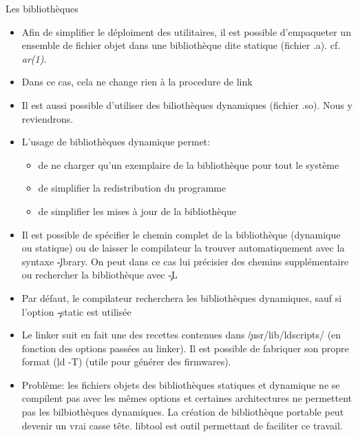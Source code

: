 \begin{frame}[fragile=singleslide]{Les bibliothèques}
  \begin{itemize} 
  \item  Afin de  simplifier  le déploiment  des  utilitaires, il  est
    possible  d'empaqueter  un  ensemble  de fichier  objet  dans  une
    bibliothèque dite statique (fichier .a). cf. \emph{ar(1)}.
  \item Dans ce cas, cela ne change rien à la procedure de link
  \item Il  est aussi possible d'utiliser  des biliothèques dynamiques
    (fichier .so). Nous y reviendrons.
  \item L'usage de bibliothèques dynamique permet:
    \begin{itemize} 
    \item de ne charger qu'un  exemplaire de la bibliothèque pour tout
      le système
    \item de simplifier la redistribution du programme
    \item de simplifier les mises à jour de la bibliothèque
    \end{itemize} 
  \item  Il  est  possible  de  spécifier  le  chemin  complet  de  la
    bibliothèque (dynamique ou statique)  ou de laisser le compilateur
    la trouver  automatiquement avec  la syntaxe \c{-lbrary}.  On peut
    dans ce cas lui précisier des chemins supplémentaire ou rechercher
    la bibliothèque avec \c{-L}
  \item  Par  défaut,  le  compilateur  recherchera  les  bibliothèques
    dynamiques, sauf si l'option \c{-static} est utilisée
  \item  Le  linker suit  en  fait  une  des recettes  contenues  dans
    \c{/usr/lib/ldscripts/}  (en  fonction   des  options  passées  au
    linker).   Il   est  possible  de  fabriquer   son  propre  format
    (\c{ld -T}) (utile pour générer des firmwares).
  \item Problème:  les fichiers objets des  bibliothèques statiques et
    dynamique ne se compilent pas  avec les mêmes options et certaines
    architectures ne permettent  pas les bilbiothèques dynamiques.  La
    création  de  bibliothèque portable  peut  devenir  un vrai  casse
    tête. libtool est outil permettant de faciliter ce travail.
  \end{itemize}
\end{frame} 

